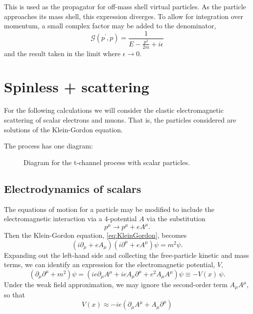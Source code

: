 \documentclass{report}
\begin{document}
This is used as the propagator for off-mass shell virtual particles. As the particle approaches its mass shell, this expression diverges. To allow for integration over momentum, a small complex factor may be added to the denominator,
\begin{equation}
\mathcal{G}(p^\prime, p) = \frac{1}{E - \frac{p^2}{2m} + i\epsilon}
\end{equation}
and the result taken in the limit where $\epsilon \rightarrow 0$.

\chapter{Spinless \Pelectron + \Pmuon scattering}
For the following calculations we will consider the elastic electromagnetic scattering of scalar electrons and muons. That is, the particles considered are solutions of the Klein-Gordon equation.

The process has one diagram:
\begin{figure}[h]
\centering

\caption{Diagram for the t-channel process \HepProcess{\Pelectron+\Pmuon\to\Pelectron+\Pmuon} with scalar particles.\label{fig:emuscatter}}
\end{figure}

\section{Electrodynamics of scalars}\label{sec:EMdynamics}
The equations of motion for a particle may be modified to include the electromagnetic interaction via a 4-potential $A$ via the substitution
\begin{equation}
p^\mu \rightarrow p^\mu + eA^\mu.
\end{equation}
Then the Klein-Gordon equation, \eqref{eq:KleinGordon}, becomes
\begin{equation}
\left( i\partial_\mu + eA_\mu \right)\left( i\partial^\mu + eA^\mu \right)\psi = m^2\psi.
\end{equation}
Expanding out the left-hand side and collecting the free-particle kinetic and mass terms, we can identify an expression for the electromagnetic potential, $V$,
\begin{equation}
\left( \partial_\mu\partial^\mu + m^2 \right)\psi = \left( ie\partial_\mu A^\mu + ieA_\mu\partial^\mu + e^2A_\mu A^\mu \right)\psi \equiv -V(x) \,\psi.
\end{equation}
Under the weak field approximation, we may ignore the second-order term $A_\mu A^\mu$, so that
\begin{equation}
V(x) \approx -ie\left( \partial_\mu A^\mu + A_\mu\partial^\mu \right)
\end{equation}
\end{document}
